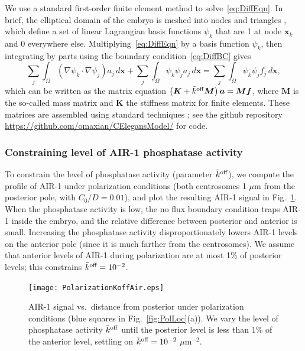 \documentclass[11pt]{article}
\newcommand{\V}[1]{\boldsymbol{#1}}                 %
\newcommand{\M}[1]{\boldsymbol{#1}}
\begin{document}
\begin{appendix}
We use a standard first-order finite element method to solve\ \eqref{eq:DiffEqn}. In brief, the elliptical domain of the embryo is meshed into nodes and triangles \citep{persson2004simple}, which define a set of linear Lagrangian basis functions $\psi_k$ that are 1 at node $\V{x}_k$ and 0 everywhere else. Multiplying\ \eqref{eq:DiffEqn} by a basis function $\psi_k$, then integrating by parts using the boundary condition\ \eqref{eq:DiffBC} gives 
\begin{equation}
\sum_j \int_{\Omega} \left(\nabla \psi_k \cdot \nabla \psi_j\right) a_j \, d\V{x}+\sum_j \int_{\Omega} \psi_k \psi_j a_j \, d\V{x}= \sum_j \int_{\Omega} \psi_k \psi_j f_j \, d\V{x},
\end{equation}
which can be written as the matrix equation $\left(\M K + \koffb \M M \right) \V a = \M M \V f$, where $\M{M}$ is the so-called mass matrix and $\M{K}$ the stiffness matrix for finite elements. These matrices are assembled using standard techniques \citep[c.~7]{gockenbach2006understanding}; see the github repository \url{https://github.com/omaxian/CElegansModel/} for code.

\subsubsection{Constraining level of AIR-1 phosphatase activity}
To constrain the level of phosphatase activity (parameter $\bar{k}^\text{off}$), we compute the profile of AIR-1 under polarization conditions (both centrosomes 1 $\mu$m from the posterior pole, with $C_0/D=0.01$), and plot the resulting AIR-1 signal in Fig.\ \ref{fig:AIR1ProfKoff}. When the phosphatase activity is low, the no flux boundary condition traps AIR-1 inside the embryo, and the relative difference between posterior and anterior is small. Increasing the phosphatase activity disproportionately lowers AIR-1 levels on the anterior pole (since it is much farther from the centrosomes). We assume that anterior levels of AIR-1 during polarization are at most 1\% of posterior levels; this constrains $\bar{k}^\text{off}=10^{-2}$. 

\begin{figure}
\centering
\texttt{[image: PolarizationKoffAir.eps]}
\caption{\label{fig:AIR1ProfKoff}AIR-1 signal vs.\ distance from posterior under polarization conditions (blue squares in Fig.\ \ref{fig:PolLoc}(a)). We vary the level of phosphatase activity $\bar{k}^\text{off}$ until the posterior level is less than 1\% of the anterior level, settling on $\bar{k}^\text{off}=10^{-2}$ $\mu$m$^{-2}$.}
\end{figure}



\end{appendix}
\end{document}
